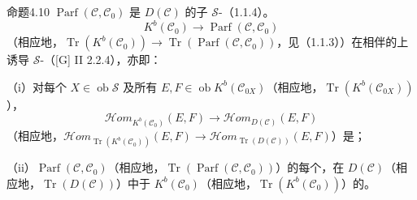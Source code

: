 \begin{SGAresult}{命题}{4.10}
 $\operatorname{Parf}(\mathcal C,\mathcal C_0)$ 是 $D(\mathcal C)$ 的子 $\mathscr S$-（1.1.4）。
\[K^b(\mathcal C_0)\longrightarrow\operatorname{Parf}(\mathcal C,\mathcal C_0)\]
（相应地，$\operatorname{Tr}(K^b(\mathcal C_0))\to\operatorname{Tr}(\operatorname{Parf}(\mathcal C,\mathcal C_0))$，见（1.1.3））在相伴的上诱导 $\mathscr S$-（[G] II 2.2.4），亦即：

（i）对每个 $X\in\operatorname{ob}\mathscr S$ 及所有 $E,F\in\operatorname{ob}K^b(\mathcal C_{0X})$（相应地，$\operatorname{Tr}(K^b(\mathcal C_{0X}))$），
\[\mathcal Hom_{K^b(\mathcal C_0)}(E,F)\longrightarrow\mathcal Hom_{D(\mathcal C)}(E,F)\]
（相应地，$\mathcal Hom_{\operatorname{Tr}(K^b(\mathcal C_0))}(E,F)\to\mathcal Hom_{\operatorname{Tr}(D(\mathcal C))}(E,F)$）是；

（ii）$\operatorname{Parf}(\mathcal C,\mathcal C_0)$（相应地，$\operatorname{Tr}(\operatorname{Parf}(\mathcal C,\mathcal C_0))$）的每个，在 $D(\mathcal C)$（相应地，$\operatorname{Tr}(D(\mathcal C))$）中于 $K^b(\mathcal C_0)$（相应地，$\operatorname{Tr}(K^b(\mathcal C_0))$）的。
\end{SGAresult}
